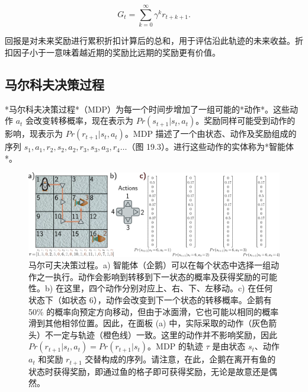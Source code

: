 \begin{equation}
G_t = \sum_{k=0}^{\infty} \gamma^k r_{t+k+1}. 
\end{equation}

回报是对未来奖励进行累积折扣计算后的总和，用于评估沿此轨迹的未来收益。折扣因子小于一意味着越近期的奖励比远期的奖励更有价值。

\subsection{马尔科夫决策过程}

*马尔科夫决策过程*（MDP）为每一个时间步增加了一组可能的*动作*。这些动作 \(a_t\) 会改变转移概率，现在表示为 \(Pr(s_{t+1}|s_t, a_t)\)。奖励同样可能受到动作的影响，现表示为 \(Pr(r_{t+1}|s_t, a_t)\)。MDP 描述了一个由状态、动作及奖励组成的序列 \(s_1, a_1, r_2, s_2, a_2, r_3, s_3, a_3, r_4 \ldots\)（图 19.3）。进行这些动作的实体称为*智能体*。

\begin{figure}[ht!]
\centering
\includegraphics[width=0.7\linewidth]{png/chapter19/ReinforceMDP3.png}
\caption{马尔可夫决策过程。a) 智能体（企鹅）可以在每个状态中选择一组动作之一执行。动作会影响到转移到下一状态的概率及获得奖励的可能性。b) 在这里，四个动作分别对应上、右、下、左移动。c) 在任何状态下（如状态 6），动作会改变到下一个状态的转移概率。企鹅有 50\% 的概率向预定方向移动，但由于冰面滑，它也可能以相同的概率滑到其他相邻位置。因此，在面板 (a) 中，实际采取的动作（灰色箭头）不一定与轨迹（橙色线）一致。这里的动作并不影响奖励，因此 \(Pr(r_{t+1}|s_t, a_t) = Pr(r_{t+1}|s_t)\)。MDP 的轨迹 \(\tau\) 是由状态 \(s_t\)、动作 \(a_t\) 和奖励 \(r_{t+1}\) 交替构成的序列。请注意，在此，企鹅在离开有鱼的状态时获得奖励，即通过鱼的格子即可获得奖励，无论是故意还是偶然。}
\end{figure}

